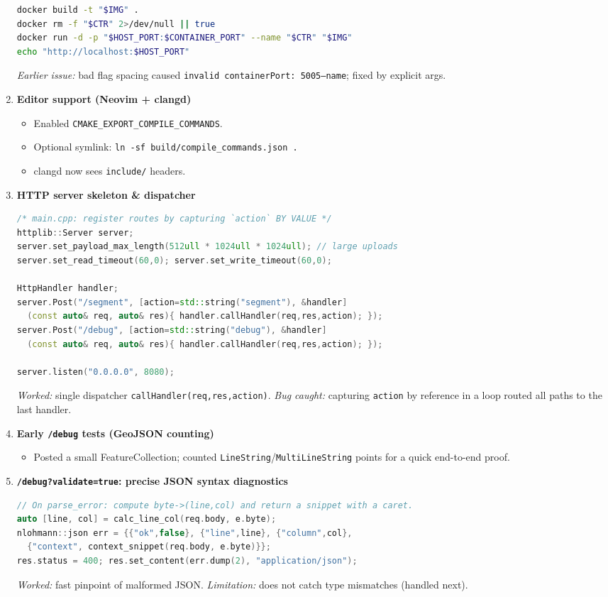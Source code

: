 \documentclass[11pt,twoside]{report}
\begin{document}
\begin{enumerate}
\begin{lstlisting}[language=bash]
docker build -t "$IMG" .
docker rm -f "$CTR" 2>/dev/null || true
docker run -d -p "$HOST_PORT:$CONTAINER_PORT" --name "$CTR" "$IMG"
echo "http://localhost:$HOST_PORT"
    \end{lstlisting}
	      \subitem \textit{Earlier issue:} bad flag spacing caused \texttt{invalid containerPort: 5005--name}; fixed by explicit args.

	\item \textbf{Editor support (Neovim + clangd)}
	      \begin{itemize}
		      \item Enabled \texttt{CMAKE\_EXPORT\_COMPILE\_COMMANDS}.
		      \item Optional symlink: \texttt{ln -sf build/compile\_commands.json .}
		      \item clangd now sees \texttt{include/} headers.
	      \end{itemize}

	\item \textbf{HTTP server skeleton \& dispatcher}
	      \begin{lstlisting}[language=C++]
/* main.cpp: register routes by capturing `action` BY VALUE */
httplib::Server server;
server.set_payload_max_length(512ull * 1024ull * 1024ull); // large uploads
server.set_read_timeout(60,0); server.set_write_timeout(60,0);

HttpHandler handler;
server.Post("/segment", [action=std::string("segment"), &handler]
  (const auto& req, auto& res){ handler.callHandler(req,res,action); });
server.Post("/debug", [action=std::string("debug"), &handler]
  (const auto& req, auto& res){ handler.callHandler(req,res,action); });

server.listen("0.0.0.0", 8080);
    \end{lstlisting}
	      \subitem \textit{Worked:} single dispatcher \texttt{callHandler(req,res,action)}.
	      \subitem \textit{Bug caught:} capturing \texttt{action} by reference in a loop routed all paths to the last handler.

	\item \textbf{Early \texttt{/debug} tests (GeoJSON counting)}
	      \begin{itemize}
		      \item Posted a small FeatureCollection; counted \texttt{LineString}/\texttt{MultiLineString} points for a quick end-to-end proof.
	      \end{itemize}

	\item \textbf{\texttt{/debug?validate=true}: precise JSON syntax diagnostics}
	      \begin{lstlisting}[language=C++]
// On parse_error: compute byte->(line,col) and return a snippet with a caret.
auto [line, col] = calc_line_col(req.body, e.byte);
nlohmann::json err = {{"ok",false}, {"line",line}, {"column",col},
  {"context", context_snippet(req.body, e.byte)}};
res.status = 400; res.set_content(err.dump(2), "application/json");
    \end{lstlisting}
	      \subitem \textit{Worked:} fast pinpoint of malformed JSON.
	      \subitem \textit{Limitation:} does not catch type mismatches (handled next).


\end{enumerate}
\end{document}
